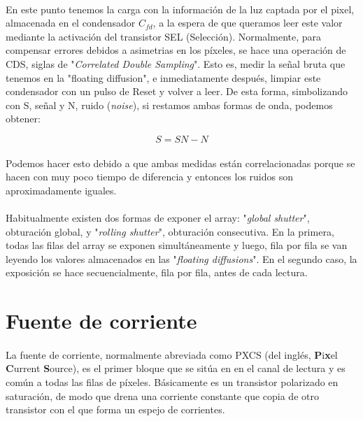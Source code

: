 \paragraph{}
En este punto tenemos la carga con la información de la luz captada por el pixel,
almacenada en el condensador $C_{fd}$, a la espera de que queramos leer este valor
mediante la activación del transistor SEL (Selección). Normalmente, para compensar
errores debidos a asimetrias en los píxeles, se hace una operación de CDS, siglas de
"\textit{Correlated Double Sampling}". Esto es, medir la señal bruta que tenemos
en la "floating diffusion", e inmediatamente después, limpiar este condensador con
un pulso de Reset y volver a leer. De esta forma, simbolizando con S, señal y N,
ruido (\textit{noise}), si restamos ambas formas de onda, podemos obtener:

\begin{equation}
	\label{eq:CDS_operation}
	S = SN - N
\end{equation}

\paragraph{}
Podemos hacer esto debido a que ambas medidas  están correlacionadas porque se
hacen con muy poco tiempo de diferencia y entonces los ruidos son aproximadamente
iguales.

\paragraph{}
Habitualmente existen dos formas de exponer el array: "\textit{global shutter}",
obturación global, y "\textit{rolling shutter}", obturación consecutiva. En la
primera, todas las filas del array se exponen simultáneamente y luego, fila por fila
se van leyendo los valores almacenados en las "\textit{floating diffusions}". En
el segundo caso, la exposición se hace secuencialmente, fila por fila, antes de cada
lectura.

\section{Fuente de corriente}\label{cap:ro_sch_pxcs}
\paragraph{}
La fuente de corriente, normalmente abreviada como PXCS (del inglés,
\textbf{P}i\textbf{x}el \textbf{C}urrent \textbf{S}ource),
es el primer bloque que se sitúa en
en el canal de lectura y es común a todas las filas de píxeles. Básicamente
es un transistor polarizado en saturación, de modo que drena una corriente
constante que copia de otro transistor con el que forma un espejo de corrientes.

